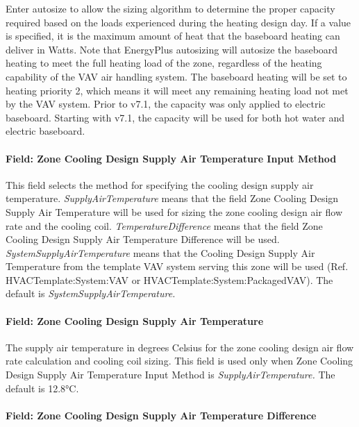 Enter autosize to allow the sizing algorithm to determine the proper capacity required based on the loads experienced during the heating design day. If a value is specified, it is the maximum amount of heat that the baseboard heating can deliver in Watts. Note that EnergyPlus autosizing will autosize the baseboard heating to meet the full heating load of the zone, regardless of the heating capability of the VAV air handling system. The baseboard heating will be set to heating priority 2, which means it will meet any remaining heating load not met by the VAV system. Prior to v7.1, the capacity was only applied to electric baseboard. Starting with v7.1, the capacity will be used for both hot water and electric baseboard.

\paragraph{Field: Zone Cooling Design Supply Air Temperature Input Method}\label{field-zone-cooling-design-supply-air-temperature-input-method-7}

This field selects the method for specifying the cooling design supply air temperature. \emph{SupplyAirTemperature} means that the field Zone Cooling Design Supply Air Temperature will be used for sizing the zone cooling design air flow rate and the cooling coil. \emph{TemperatureDifference} means that the field Zone Cooling Design Supply Air Temperature Difference will be used. \emph{SystemSupplyAirTemperature} means that the Cooling Design Supply Air Temperature from the template VAV system serving this zone will be used (Ref. HVACTemplate:System:VAV or HVACTemplate:System:PackagedVAV). The default is \emph{SystemSupplyAirTemperature.}

\paragraph{Field: Zone Cooling Design Supply Air Temperature}\label{field-zone-cooling-design-supply-air-temperature-6}

The supply air temperature in degrees Celsius for the zone cooling design air flow rate calculation and cooling coil sizing. This field is used only when Zone Cooling Design Supply Air Temperature Input Method is \emph{SupplyAirTemperature.} The default is 12.8°C.

\paragraph{Field: Zone Cooling Design Supply Air Temperature Difference}\label{field-zone-cooling-design-supply-air-temperature-difference-7}

